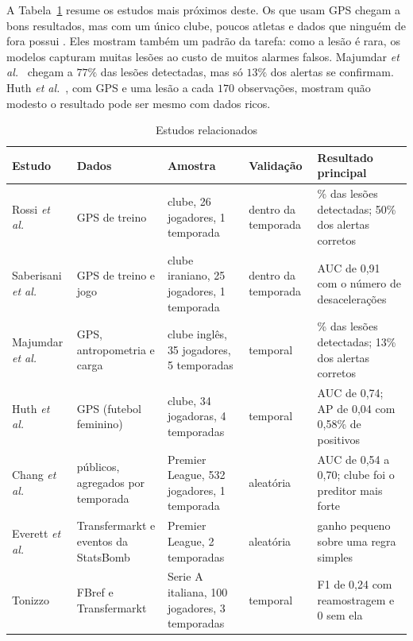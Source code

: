 \documentclass[conference]{IEEEtran}
\begin{document}
A Tabela~\ref{tab:literatura} resume os estudos mais próximos deste. Os que usam GPS chegam a bons resultados, mas com um único clube, poucos atletas e dados que ninguém de fora possui \cite{rossi2018,saberisani2025,majumdar2024,huth2026}. Eles mostram também um padrão da tarefa: como a lesão é rara, os modelos capturam muitas lesões ao custo de muitos alarmes falsos. Majumdar \textit{et al.}~\cite{majumdar2024} chegam a $77\%$ das lesões detectadas, mas só $13\%$ dos alertas se confirmam. Huth \textit{et al.}~\cite{huth2026}, com GPS e uma lesão a cada $170$ observações, mostram quão modesto o resultado pode ser mesmo com dados ricos.

\begin{table}[!t]
\caption{Estudos relacionados}
\label{tab:literatura}
\centering
\footnotesize
\begin{tabular}{>{\raggedright\arraybackslash}p{2.3cm} >{\raggedright\arraybackslash}p{3.4cm} >{\raggedright\arraybackslash}p{3.3cm} >{\raggedright\arraybackslash}p{2.6cm} >{\raggedright\arraybackslash}p{4.4cm}}
\toprule
Estudo & Dados & Amostra & Validação & Resultado principal \\
\midrule
Rossi \textit{et al.}~\cite{rossi2018} & GPS de treino & 1 clube, 26 jogadores, 1 temporada & dentro da temporada & 80\% das lesões detectadas; 50\% dos alertas corretos \\
Saberisani \textit{et al.}~\cite{saberisani2025} & GPS de treino e jogo & 1 clube iraniano, 25 jogadores, 1 temporada & dentro da temporada & AUC de 0,91 com o número de desacelerações \\
Majumdar \textit{et al.}~\cite{majumdar2024} & GPS, antropometria e carga & 1 clube inglês, 35 jogadores, 5 temporadas & temporal & 77\% das lesões detectadas; 13\% dos alertas corretos \\
Huth \textit{et al.}~\cite{huth2026} & GPS (futebol feminino) & 1 clube, 34 jogadoras, 4 temporadas & temporal & AUC de 0,74; AP de 0,04 com 0,58\% de positivos \\
Chang \textit{et al.}~\cite{chang2024} & públicos, agregados por temporada & Premier League, 532 jogadores, 1 temporada & aleatória & AUC de 0,54 a 0,70; clube foi o preditor mais forte \\
Everett \textit{et al.}~\cite{everett2024} & Transfermarkt e eventos da StatsBomb & Premier League, 2 temporadas & aleatória & ganho pequeno sobre uma regra simples \\
Tonizzo~\cite{tonizzo2025} & FBref e Transfermarkt & Serie A italiana, 100 jogadores, 3 temporadas & temporal & F1 de 0,24 com reamostragem e 0 sem ela \\
\bottomrule
\end{tabular}
\end{table}
\end{document}
